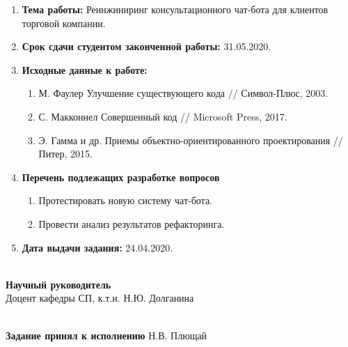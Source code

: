 \begin{titlepage}
    \begin{enumerate}
        \item \textbf{Тема работы:}
        Реинжиниринг консультационного чат-бота для клиентов торговой компании.
        \item \textbf{Срок сдачи студентом законченной работы:} 31.05.2020.
        \item \textbf{Исходные данные к работе:}
        \begin{enumerate}
            \item М. Фаулер Улучшение существующего кода // Символ-Плюс, 2003.
            \item С. Макконнел Совершенный код // Microsoft Press, 2017.
            \item Э. Гамма и др. Приемы объектно-ориентированного проектирования // Питер, 2015.
        \end{enumerate}
        \item \textbf{Перечень подлежащих разработке вопросов}
        \begin{enumerate}
            \item Протестировать новую систему чат-бота.
            \item Провести анализ результатов рефакторинга.
        \end{enumerate}
        \item \textbf{Дата выдачи задания:} 24.04.2020.
    \end{enumerate}

    \noindent\\
    \textbf{Научный руководитель}\\
    Доцент кафедры СП, к.т.н. \hfill Н.Ю. Долганина
    
    \noindent\\
    \textbf{Задание принял к исполнению} \hfill Н.В. Плющай

    \thispagestyle{empty}
\end{titlepage}